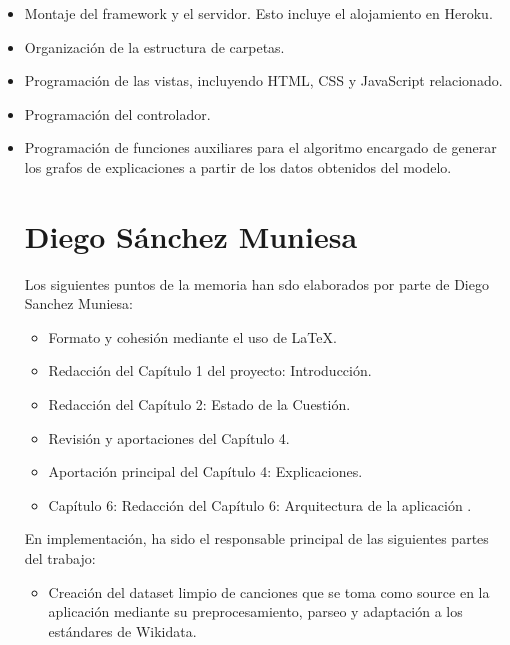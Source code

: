 \begin{itemize}
\item Montaje del framework y el servidor. Esto incluye el alojamiento en Heroku.

\item Organización de la estructura de carpetas.

\item Programación de las vistas, incluyendo HTML, CSS y JavaScript relacionado.

\item Programación del controlador.

\item Programación de funciones auxiliares para el algoritmo encargado de generar los grafos de explicaciones a partir de los datos obtenidos del modelo.





\section{Diego Sánchez Muniesa}

Los siguientes puntos de la memoria han sdo elaborados por parte de Diego Sanchez Muniesa:

\begin{itemize}
\item Formato y cohesión mediante el uso de LaTeX.

\item Redacción del Capítulo 1 del proyecto: Introducción.

\item Redacción del Capítulo 2: Estado de la Cuestión.

\item Revisión y aportaciones del Capítulo 4.

\item Aportación principal del Capítulo 4: Explicaciones.

\item Capítulo 6: Redacción del Capítulo 6: Arquitectura de la aplicación .\\

\end{itemize}

En implementación, ha sido el responsable principal de las siguientes partes del trabajo:

\begin{itemize}

\item Creación del dataset limpio de canciones que se toma como source en la aplicación mediante su preprocesamiento, parseo y adaptación a los estándares de Wikidata.


\end{itemize}
\end{itemize}
